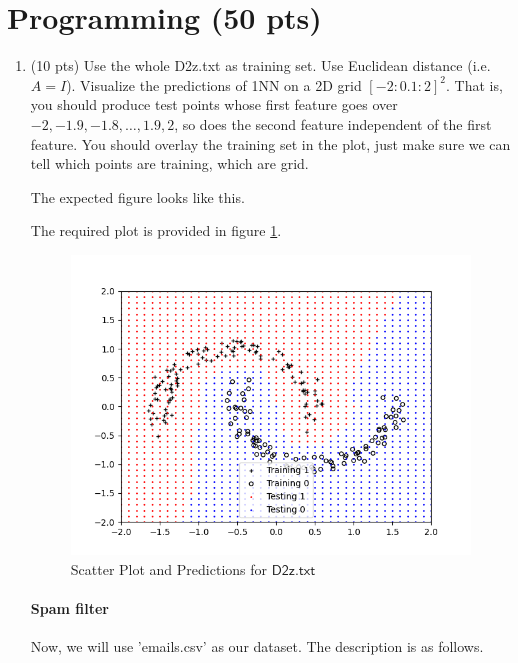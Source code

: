 \documentclass[a4paper]{article}
\theoremstyle{definition}
\newenvironment{soln}{
    \leavevmode\color{blue}\ignorespaces
}{}
\begin{document}
\section{Programming (50 pts)}
\begin{enumerate}
	\item (10 pts) Use the whole D2z.txt as training set.  Use Euclidean distance (i.e. $A=I$).
	Visualize the predictions of 1NN on a 2D grid $[-2:0.1:2]^2$.
	That is, you should produce test points whose first feature goes over $-2, -1.9, -1.8, \ldots, 1.9, 2$, so does the second feature independent of the first feature.
	You should overlay the training set in the plot, just make sure we can tell which points are training, which are grid.
	
	The expected figure looks like this.

 \begin{soln}
    The required plot is provided in figure \ref{fig:2}.
     \begin{figure}[H]
         \centering
         \includegraphics[width=0.75\linewidth]{Scatter_oneNN.png}
         \caption{Scatter Plot and Predictions for $\mathsf{D2z.txt}$}
         \label{fig:2}
     \end{figure}
 \end{soln}
	
	\paragraph{Spam filter} Now, we will use 'emails.csv' as our dataset. The description is as follows.
	

\end{enumerate}
\end{document}
